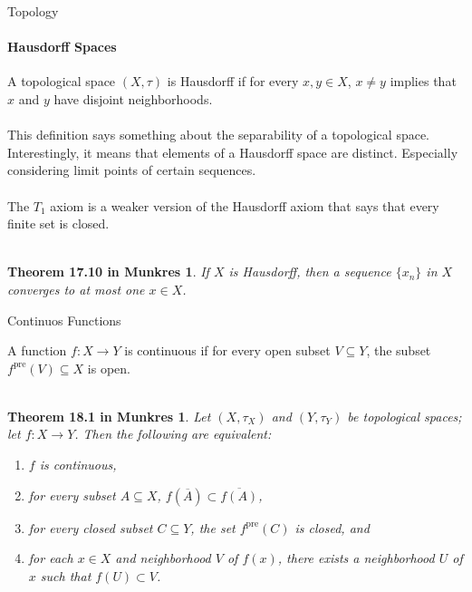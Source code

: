 \documentclass[pdf]{beamer}
\begin{document}
    \begin{frame}{Topology}
        \framesubtitle{Hausdorff Spaces}
        \newtheorem{thrm:conv}{Theorem 17.10 in Munkres}

        A topological space $(X, \tau)$ is {\color{red} Hausdorff} if for every $x, y \in X$,
        $x \neq y$ implies that $x$ and $y$ have disjoint neighborhoods. \\~\\

        This definition says something about the separability of a topological space. Interestingly,
        it means that elements of a Hausdorff space are distinct. Especially considering limit 
        points of certain sequences. \\~\\

        The $T_1$ axiom is a weaker version of the Hausdorff axiom that says that every
        finite set is closed. \\~\\

        \begin{thrm:conv}
            If $X$ is Hausdorff, then a sequence $\{x_n\}$ in $X$ converges to at most one $x \in X$.
        \end{thrm:conv}

    \end{frame}

    \begin{frame}{Continuos Functions}
        \newtheorem{thrm:cont}{Theorem 18.1 in Munkres}

        A function $f: X \to Y$ is {\color{red} continuous} if for every open subset $V \subseteq Y$,
        the subset $f^{\text{pre}}(V) \subseteq X$ is open. \\~\\

        \begin{thrm:cont}
            Let $(X, \tau_X)$ and $(Y, \tau_Y)$ be topological spaces; let $f: X \to Y$. Then the following
            are equivalent:
            \begin{enumerate}
                \item $f$ is continuous,
                \item for every subset $A \subseteq X$, $f(\overline{A}) \subset \overline{f(A)}$,
                \item for every closed subset $C \subseteq Y$, the set $f^{\text{pre}}(C)$ is closed, and
                \item for each $x \in X$ and neighborhood $V$ of $f(x)$, there exists a neighborhood $U$ of $x$
                      such that $f(U) \subset V$.
            \end{enumerate}
        \end{thrm:cont}
        
    \end{frame}
\end{document}
